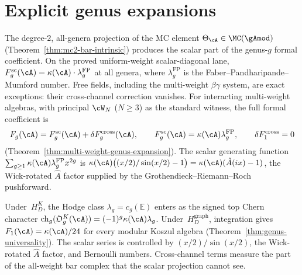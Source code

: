 \chapter{Explicit genus expansions}\label{ch:genus-expansions}

The degree-$2$, all-genera projection of the MC element
$\Theta_\cA \in \MC(\gAmod)$
(Theorem~\ref{thm:mc2-bar-intrinsic}) produces the scalar part of
the genus-$g$ formal coefficient. On the proved uniform-weight
scalar-diagonal lane,
$F_g^{\mathrm{sc}}(\cA) = \kappa(\cA) \cdot \lambda_g^{\mathrm{FP}}$
at all genera, where $\lambda_g^{\mathrm{FP}}$ is the
Faber--Pandharipande--Mumford number. Free fields, including
the multi-weight $\beta\gamma$ system, are exact exceptions:
their cross-channel correction vanishes. For interacting
multi-weight algebras, with principal $\cW_N$ ($N \geq 3$)
as the standard witness, the full formal coefficient is
\[
F_g(\cA)
=F_g^{\mathrm{sc}}(\cA)
+\delta F_g^{\mathrm{cross}}(\cA),
\qquad
F_g^{\mathrm{sc}}(\cA)=\kappa(\cA)\lambda_g^{\mathrm{FP}},
\qquad
\delta F_1^{\mathrm{cross}}=0
\]
(Theorem~\ref{thm:multi-weight-genus-expansion}).
The scalar generating function
$\sum_{g\geq1}\kappa(\cA)\lambda_g^{\mathrm{FP}}x^{2g}$
is
$\kappa(\cA)\bigl((x/2)/\sin(x/2)-1\bigr)
=\kappa(\cA)(\hat{A}(ix)-1)$, the Wick-rotated $\hat{A}$ factor
supplied by the Grothendieck--Riemann--Roch pushforward.

\medskip
Under~$H_D^K$, the Hodge class $\lambda_g=c_g(\mathbb E)$ enters as
the signed top Chern character
$\operatorname{ch}_g(\mathfrak O_g^K(\cA))=
(-1)^g\kappa(\cA)\lambda_g$.  Under~$H_D^{\mathrm{graph}}$, integration
gives
$F_1(\cA)=\kappa(\cA)/24$ for every modular Koszul algebra
(Theorem~\ref{thm:genus-universality}). The scalar series
is controlled by $(x/2)/\sin(x/2)$, the Wick-rotated $\hat{A}$ factor,
and Bernoulli numbers. Cross-channel terms measure the part of the
all-weight bar complex that the scalar projection cannot see.

